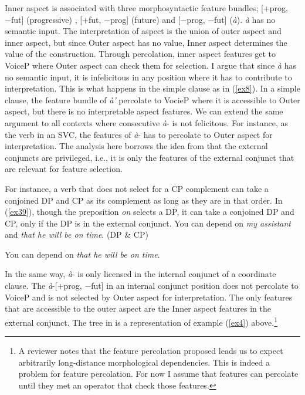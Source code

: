 \documentclass[output=paper,colorlinks,citecolor=brown]{langscibook}
\begin{document}
Inner aspect is associated with three morphosyntactic feature bundles; [+prog, −fut] ({progressive}) , [+fut, −prog] ({future}) and [−prog, −fut] (\emph{à}).  \emph{à} has no semantic input. The interpretation of aspect is the union of outer aspect and inner aspect, but since Outer aspect has no value, Inner aspect determines the value of the construction. Through percolation, inner aspect features get to VoiceP where Outer aspect can check them for selection.  I argue that since \emph{à} has no semantic input, it is infelicitous in any position where it has to contribute to interpretation. This is what happens in the simple clause as in (\ref{ex8}). In a simple clause, the feature bundle of \emph{à'}  percolate to VocieP where it is accessible to Outer aspect, but there is no interpretable aspect features. We can extend the same argument to all contexts where consecutive \emph{à}- is not felicitous. For instance, as the verb in an SVC, the features of \emph{à}- has to percolate to Outer aspect for interpretation. The analysis here borrows the idea from  \citet{Zhang2009} that the external conjuncts are privileged, i.e., it is only the features of the external conjunct that are relevant for feature selection. 

For instance, a verb that does not select for a CP complement can take a conjoined DP and CP as its complement as long as they are in that order. In (\ref{ex39}), though the preposition \emph{ on} selects a DP, it can take a conjoined DP and CP, only if the DP is in the external conjunct.
\ea\label{ex39}
\ea You can depend on \textit{my assistant} and \textit{that he will be on time}. (DP \& CP)

\ex You can depend on \textit{that he will be on time}.

\z 
\z  In the same way, \emph{à}-  is only licensed in the internal conjunct of a coordinate clause. The \emph{à}-[+prog, −fut] in an internal conjunct position does not percolate to VoiceP and is not selected by Outer aspect for interpretation. The only features that are accessible to the outer aspect are the Inner aspect features in the external conjunct. The tree in  is a representation of example (\ref{ex4}) above.\footnote{A reviewer notes that the feature percolation proposed leads us to expect arbitrarily long-distance morphological dependencies. This is indeed a problem for feature percolation. For now I assume that features can percolate until they met an operator that check those features.}  
\end{document}
